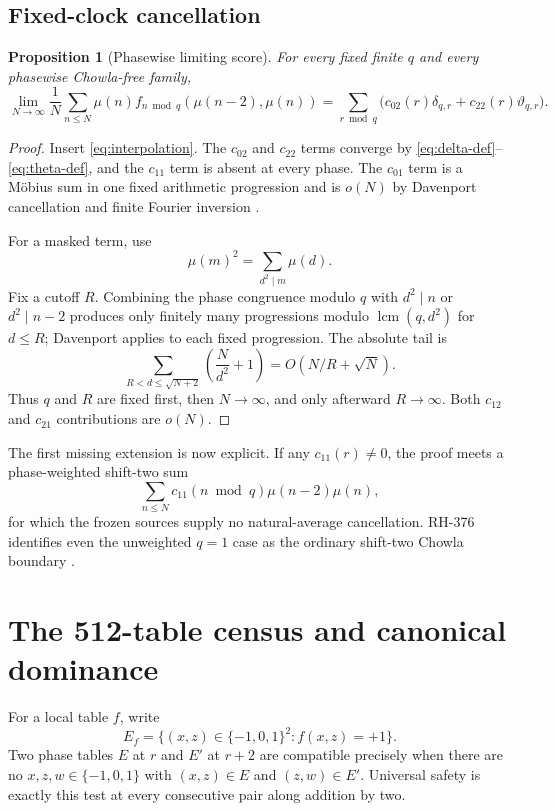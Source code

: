 \documentclass[11pt]{article}
\newtheorem{proposition}[theorem]{Proposition}
\theoremstyle{definition}
\theoremstyle{remark}
\newcommand{\mob}{\mu}
\newcommand{\TT}{\{-1,0,1\}}
\newcommand{\dd}{\delta}
\newcommand{\thh}{\vartheta}
\begin{document}
\subsection{Fixed-clock cancellation}

\begin{proposition}[Phasewise limiting score]
\label{prop:phase-limit}
For every fixed finite $q$ and every phasewise Chowla-free family,
\begin{equation}
 \lim_{N\to\infty}\frac1N\sum_{n\le N}
 \mob(n)f_{n\bmod q}(\mob(n-2),\mob(n))
 =\sum_{r\bmod q}\bigl(c_{02}(r)\dd_{q,r}
                         +c_{22}(r)\thh_{q,r}\bigr).
 \label{eq:phase-limit}
\end{equation}
\end{proposition}

\begin{proof}
Insert \eqref{eq:interpolation}.  The $c_{02}$ and $c_{22}$ terms converge
by \eqref{eq:delta-def}--\eqref{eq:theta-def}, and the $c_{11}$ term is
absent at every phase.  The $c_{01}$ term is a M\"obius sum in one fixed
arithmetic progression and is $o(N)$ by Davenport cancellation and finite
Fourier inversion \cite{Davenport1937}.

For a masked term, use
\[
                       \mob(m)^2=\sum_{d^2\mid m}\mob(d).
\]
Fix a cutoff $R$.  Combining the phase congruence modulo $q$ with
$d^2\mid n$ or $d^2\mid n-2$ produces only finitely many progressions modulo
$\operatorname{lcm}(q,d^2)$ for $d\le R$; Davenport applies to each fixed
progression.  The absolute tail is
\[
 \sum_{R<d\le\sqrt{N+2}}\left(\frac{N}{d^2}+1\right)
       =O(N/R+\sqrt N).
\]
Thus $q$ and $R$ are fixed first, then $N\to\infty$, and only afterward
$R\to\infty$.  Both $c_{12}$ and $c_{21}$ contributions are $o(N)$.
\end{proof}

The first missing extension is now explicit.  If any $c_{11}(r)\ne0$, the
proof meets a phase-weighted shift-two sum
\[
 \sum_{n\le N}c_{11}(n\bmod q)\mob(n-2)\mob(n),
\]
for which the frozen sources supply no natural-average cancellation.  RH-376
identifies even the unweighted $q=1$ case as the ordinary shift-two
Chowla boundary \cite{RH376}.

\section{The 512-table census and canonical dominance}

For a local table $f$, write
\[
              E_f=\{(x,z)\in\TT^2:f(x,z)=+1\}.
\]
Two phase tables $E$ at $r$ and $E'$ at $r+2$ are compatible precisely when
there are no $x,z,w\in\TT$ with $(x,z)\in E$ and $(z,w)\in E'$.  Universal
safety is exactly this test at every consecutive pair along addition by two.
\end{document}
